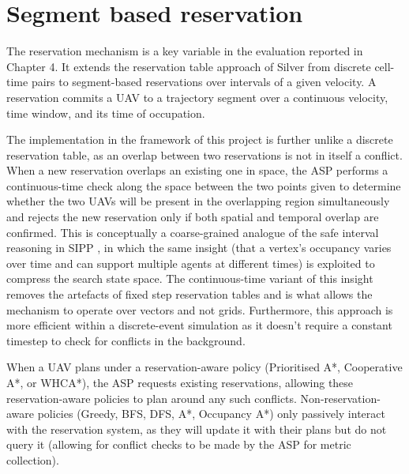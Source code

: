 \vspace{1em}

\section{Segment based reservation}

The reservation mechanism is a key variable in the evaluation reported in Chapter 4. It extends the reservation table approach of Silver \cite{silver2005cooperative} from discrete cell-time pairs to segment-based reservations over intervals of a given velocity. A reservation commits a UAV to a trajectory segment over a continuous velocity, time window, and its time of occupation. \par

\vspace{1em}

The implementation in the framework of this project is further unlike a discrete reservation table, as an overlap between two reservations is not in itself a conflict. When a new reservation overlaps an existing one in space, the ASP performs a continuous-time check along the space between the two points given to determine whether the two UAVs will be present in the overlapping region simultaneously and rejects the new reservation only if both spatial and temporal overlap are confirmed. This is conceptually a coarse-grained analogue of the safe interval reasoning in SIPP \cite{phillips2011sipp}, in which the same insight (that a vertex's occupancy varies over time and can support multiple agents at different times) is exploited to compress the search state space. The continuous-time variant of this insight removes the artefacts of fixed step reservation tables and is what allows the mechanism to operate over vectors and not grids. Furthermore, this approach is more efficient within a discrete-event simulation as it doesn't require a constant timestep to check for conflicts in the background. \par

\vspace{1em}

When a UAV plans under a reservation-aware policy (Prioritised A*, Cooperative A*, or WHCA*), the ASP requests existing reservations, allowing these reservation-aware policies to plan around any such conflicts. Non-reservation-aware policies (Greedy, BFS, DFS, A*, Occupancy A*) only passively interact with the reservation system, as they will update it with their plans but do not query it (allowing for conflict checks to be made by the ASP for metric collection).\par

